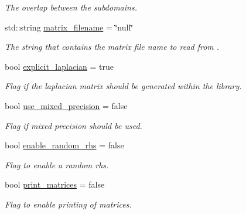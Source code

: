 \begin{DoxyCompactItemize}
\begin{DoxyCompactList}\small\item\em The overlap between the subdomains. \end{DoxyCompactList}\item 
\mbox{\label{structschwz_1_1Settings_a30bee3efa70fac8650d1c2837f1ba9c8}} 
std\+::string \hyperlink{structschwz_1_1Settings_a30bee3efa70fac8650d1c2837f1ba9c8}{matrix\+\_\+filename} = \char`\"{}null\char`\"{}
\begin{DoxyCompactList}\small\item\em The string that contains the matrix file name to read from . \end{DoxyCompactList}\item 
bool \hyperlink{structschwz_1_1Settings_a2af5f07901df047e305c456b2f97e774}{explicit\+\_\+laplacian} = true
\begin{DoxyCompactList}\small\item\em Flag if the laplacian matrix should be generated within the library. \end{DoxyCompactList}\item 
\mbox{\label{structschwz_1_1Settings_a1bb8b8ee875222bd73899ebf0447fa4e}} 
bool \hyperlink{structschwz_1_1Settings_a1bb8b8ee875222bd73899ebf0447fa4e}{use\+\_\+mixed\+\_\+precision} = false
\begin{DoxyCompactList}\small\item\em Flag if mixed precision should be used. \end{DoxyCompactList}\item 
\mbox{\label{structschwz_1_1Settings_a04760b39513414af70498808c0a6b317}} 
bool \hyperlink{structschwz_1_1Settings_a04760b39513414af70498808c0a6b317}{enable\+\_\+random\+\_\+rhs} = false
\begin{DoxyCompactList}\small\item\em Flag to enable a random rhs. \end{DoxyCompactList}\item 
\mbox{\label{structschwz_1_1Settings_afdf517a873a887a21a03b75c1011f903}} 
bool \hyperlink{structschwz_1_1Settings_afdf517a873a887a21a03b75c1011f903}{print\+\_\+matrices} = false
\begin{DoxyCompactList}\small\item\em Flag to enable printing of matrices. \end{DoxyCompactList}\item 

\end{DoxyCompactItemize}
